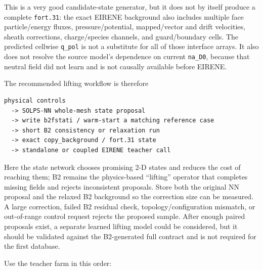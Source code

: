 \documentclass[11pt]{article}
\begin{document}
This is a very good candidate-state generator, but it does not by itself produce a complete \texttt{fort.31}: the exact EIRENE background also includes multiple face particle/energy fluxes, pressure/potential, mapped/vector and drift velocities, sheath corrections, charge/species channels, and guard/boundary cells. The predicted cellwise \texttt{q\_pol} is not a substitute for all of those interface arrays. It also does not resolve the source model's dependence on current \texttt{na\_D0}, because that neutral field did not learn and is not causally available before EIRENE.

The recommended lifting workflow is therefore

\begin{lstlisting}[basicstyle=\ttfamily\small,frame=single]
physical controls
  -> SOLPS-NN whole-mesh state proposal
  -> write b2fstati / warm-start a matching reference case
  -> short B2 consistency or relaxation run
  -> exact copy_background / fort.31 state
  -> standalone or coupled EIRENE teacher call
\end{lstlisting}

Here the state network chooses promising 2-D states and reduces the cost of reaching them; B2 remains the physics-based ``lifting'' operator that completes missing fields and rejects inconsistent proposals. Store both the original NN proposal and the relaxed B2 background so the correction size can be measured. A large correction, failed B2 residual check, topology/configuration mismatch, or out-of-range control request rejects the proposed sample. After enough paired proposals exist, a separate learned lifting model could be considered, but it should be validated against the B2-generated full contract and is not required for the first database.

Use the teacher farm in this order:
\end{document}
